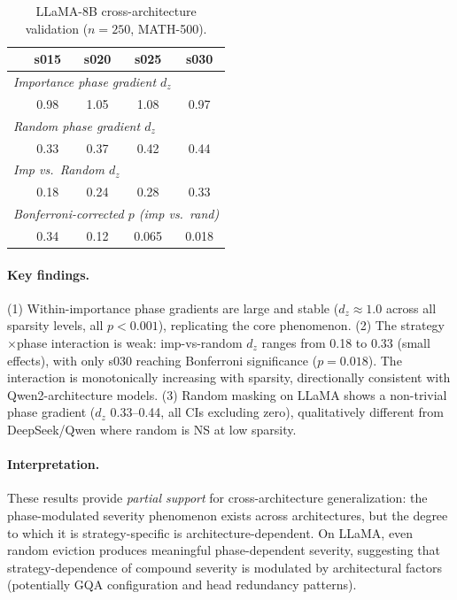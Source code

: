 \documentclass[11pt,a4paper]{article}
\begin{document}
\begin{table}[h]
\centering
\caption{LLaMA-8B cross-architecture validation ($n=250$, MATH-500).}
\label{tab:llama}
\begin{tabular}{lcccc}
\toprule
& \textbf{s015} & \textbf{s020} & \textbf{s025} & \textbf{s030} \\
\midrule
\multicolumn{5}{l}{\emph{Importance phase gradient $d_z$}} \\
& 0.98 & 1.05 & 1.08 & 0.97 \\
\midrule
\multicolumn{5}{l}{\emph{Random phase gradient $d_z$}} \\
& 0.33 & 0.37 & 0.42 & 0.44 \\
\midrule
\multicolumn{5}{l}{\emph{Imp vs.\ Random $d_z$}} \\
& 0.18 & 0.24 & 0.28 & 0.33 \\
\midrule
\multicolumn{5}{l}{\emph{Bonferroni-corrected $p$ (imp vs.\ rand)}} \\
& 0.34 & 0.12 & 0.065 & 0.018 \\
\bottomrule
\end{tabular}
\end{table}

\paragraph{Key findings.} (1) Within-importance phase gradients are large and stable ($d_z \approx 1.0$ across all sparsity levels, all $p < 0.001$), replicating the core phenomenon. (2) The strategy$\times$phase interaction is weak: imp-vs-random $d_z$ ranges from 0.18 to 0.33 (small effects), with only s030 reaching Bonferroni significance ($p = 0.018$). The interaction is monotonically increasing with sparsity, directionally consistent with Qwen2-architecture models. (3) Random masking on LLaMA shows a non-trivial phase gradient ($d_z$ 0.33--0.44, all CIs excluding zero), qualitatively different from DeepSeek/Qwen where random is NS at low sparsity.

\paragraph{Interpretation.} These results provide \emph{partial support} for cross-architecture generalization: the phase-modulated severity phenomenon exists across architectures, but the degree to which it is strategy-specific is architecture-dependent. On LLaMA, even random eviction produces meaningful phase-dependent severity, suggesting that strategy-dependence of compound severity is modulated by architectural factors (potentially GQA configuration and head redundancy patterns).
\end{document}
